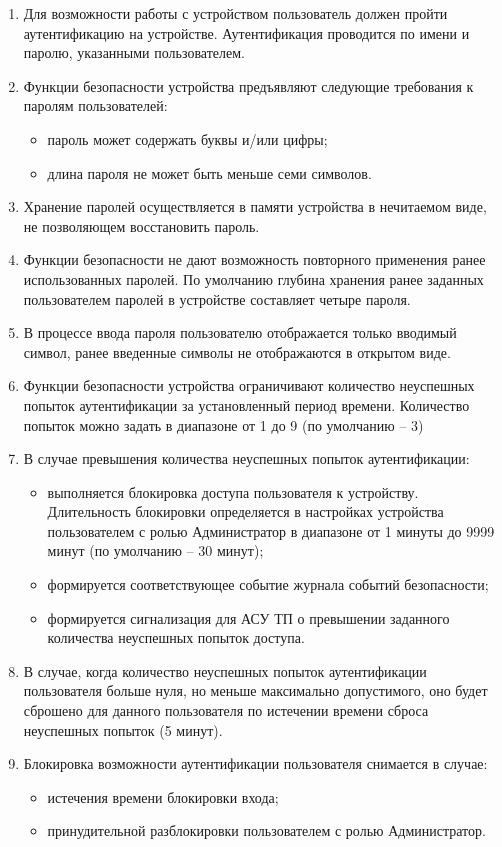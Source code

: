 \begin{enumerate}
\begin{enumerate}
\item
Для возможности работы с устройством пользователь должен пройти аутентификацию на устройстве. Аутентификация проводится по имени и паролю, указанными пользователем. 
\item
Функции безопасности устройства предъявляют следующие требования к паролям пользователей:
\begin{itemize}
    \item пароль может содержать буквы и/или цифры;
    \item длина пароля не может быть меньше семи символов. 
\end{itemize}
\item
Хранение паролей осуществляется в памяти устройства в нечитаемом виде, не позволяющем восстановить пароль.
\item
Функции безопасности не дают возможность повторного применения ранее использованных паролей. По умолчанию глубина хранения ранее заданных пользователем паролей в устройстве составляет четыре пароля.
\item
В процессе ввода пароля пользователю отображается только вводимый символ, ранее введенные символы не отображаются в открытом виде.
\item
Функции безопасности устройства ограничивают количество неуспешных попыток аутентификации за установленный период времени. Количество попыток можно задать в диапазоне от 1 до 9 (по умолчанию – 3)
\item
В случае превышения количества неуспешных попыток аутентификации:
\begin{itemize}
    \item выполняется блокировка доступа пользователя к устройству. Длительность блокировки определяется в настройках устройства пользователем с ролью Администратор в диапазоне от 1 минуты до 9999 минут (по умолчанию – 30 минут);
    \item формируется соответствующее событие журнала событий безопасности;
    \item формируется сигнализация для АСУ ТП о превышении заданного количества неуспешных попыток доступа. 
\end{itemize}
\item
В случае, когда количество неуспешных попыток аутентификации пользователя больше нуля, но меньше максимально допустимого, оно будет сброшено для данного пользователя по истечении времени сброса неуспешных попыток (5 минут).
\item
Блокировка возможности аутентификации пользователя снимается в случае:
\begin{itemize}
    \item истечения времени блокировки входа;
    \item принудительной разблокировки пользователем с ролью Администратор. 
\end{itemize}


\end{enumerate}
\end{enumerate}

